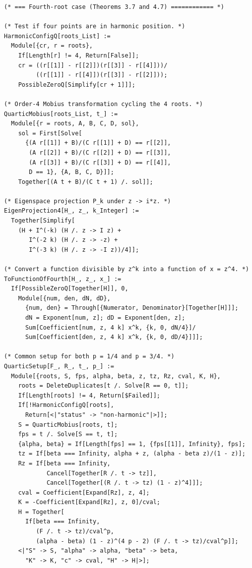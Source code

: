 \documentclass[11pt,a4paper]{article}
\theoremstyle{plain}
\theoremstyle{definition}
\theoremstyle{remark}
\begin{document}
\begin{lstlisting}
(* === Fourth-root case (Theorems 3.7 and 4.7) ============ *)

(* Test if four points are in harmonic position. *)
HarmonicConfigQ[roots_List] :=
  Module[{cr, r = roots},
    If[Length[r] != 4, Return[False]];
    cr = ((r[[1]] - r[[2]])(r[[3]] - r[[4]]))/
         ((r[[1]] - r[[4]])(r[[3]] - r[[2]]));
    PossibleZeroQ[Simplify[cr + 1]]];

(* Order-4 Mobius transformation cycling the 4 roots. *)
QuarticMobius[roots_List, t_] :=
  Module[{r = roots, A, B, C, D, sol},
    sol = First[Solve[
      {(A r[[1]] + B)/(C r[[1]] + D) == r[[2]],
       (A r[[2]] + B)/(C r[[2]] + D) == r[[3]],
       (A r[[3]] + B)/(C r[[3]] + D) == r[[4]],
       D == 1}, {A, B, C, D}]];
    Together[(A t + B)/(C t + 1) /. sol]];

(* Eigenspace projection P_k under z -> i*z. *)
EigenProjection4[H_, z_, k_Integer] :=
  Together[Simplify[
    (H + I^(-k) (H /. z -> I z) +
       I^(-2 k) (H /. z -> -z) +
       I^(-3 k) (H /. z -> -I z))/4]];

(* Convert a function divisible by z^k into a function of x = z^4. *)
ToFunctionOfFourth[H_, z_, x_] :=
  If[PossibleZeroQ[Together[H]], 0,
    Module[{num, den, dN, dD},
      {num, den} = Through[{Numerator, Denominator}[Together[H]]];
      dN = Exponent[num, z]; dD = Exponent[den, z];
      Sum[Coefficient[num, z, 4 k] x^k, {k, 0, dN/4}]/
      Sum[Coefficient[den, z, 4 k] x^k, {k, 0, dD/4}]]];

(* Common setup for both p = 1/4 and p = 3/4. *)
QuarticSetup[F_, R_, t_, p_] :=
  Module[{roots, S, fps, alpha, beta, z, tz, Rz, cval, K, H},
    roots = DeleteDuplicates[t /. Solve[R == 0, t]];
    If[Length[roots] != 4, Return[$Failed]];
    If[!HarmonicConfigQ[roots],
      Return[<|"status" -> "non-harmonic"|>]];
    S = QuarticMobius[roots, t];
    fps = t /. Solve[S == t, t];
    {alpha, beta} = If[Length[fps] == 1, {fps[[1]], Infinity}, fps];
    tz = If[beta === Infinity, alpha + z, (alpha - beta z)/(1 - z)];
    Rz = If[beta === Infinity,
            Cancel[Together[R /. t -> tz]],
            Cancel[Together[(R /. t -> tz) (1 - z)^4]]];
    cval = Coefficient[Expand[Rz], z, 4];
    K = -Coefficient[Expand[Rz], z, 0]/cval;
    H = Together[
      If[beta === Infinity,
         (F /. t -> tz)/cval^p,
         (alpha - beta) (1 - z)^(4 p - 2) (F /. t -> tz)/cval^p]];
    <|"S" -> S, "alpha" -> alpha, "beta" -> beta,
      "K" -> K, "c" -> cval, "H" -> H|>];


\end{lstlisting}
\end{document}
